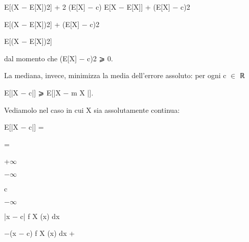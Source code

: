 \documentclass[a4paper,portrait,12pt]{article}
\begin{document}
\begin{flushleft}
E[(X $-$ E[X])2] + 2 (E[X] $-$ c) E[X $-$ E[X]] + (E[X] $-$ c)2
\end{flushleft}


\begin{flushleft}
E[(X $-$ E[X])2] + (E[X] $-$ c)2
\end{flushleft}


\begin{flushleft}
E[(X $-$ E[X])2]
\end{flushleft}





\begin{flushleft}
dal momento che (E[X] $-$ c)2 ⩾ 0.
\end{flushleft}


\begin{flushleft}
La mediana, invece, minimizza la media dell'errore assoluto: per ogni c $\in$ ℝ
\end{flushleft}


\begin{flushleft}
E[|X $-$ c|] ⩾ E[|X $-$ m X |].
\end{flushleft}


\begin{flushleft}
Vediamolo nel caso in cui X sia assolutamente continua:
\end{flushleft}


\begin{flushleft}
E[|X $-$ c|] =
\end{flushleft}


=





+$\infty$


$-$$\infty$


\begin{flushleft}
c
\end{flushleft}


$-$$\infty$





\begin{flushleft}
|x $-$ c| f X (x) dx
\end{flushleft}





\begin{flushleft}
$-$(x $-$ c) f X (x) dx +
\end{flushleft}
\end{document}
